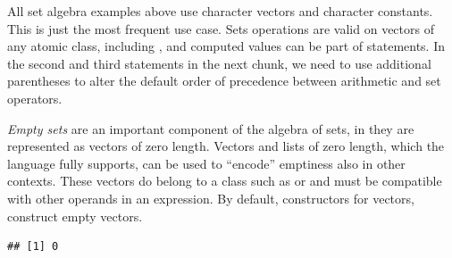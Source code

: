 \documentclass[krantz2]{krantz}\usepackage{knitr}
\begin{document}
\begin{explainbox}
All set algebra examples above use character vectors and character constants. This is just the most frequent use case. Sets operations are valid on vectors of any atomic class, including , and computed values can be part of statements. In the second and third statements in the next chunk, we need to use additional parentheses to alter the default order of precedence between arithmetic and set operators.

\begin{knitrout}\footnotesize
{}\color{fgcolor}
\end{knitrout}

\emph{Empty sets} are an important component of the algebra of sets, in \Rlang they are represented as vectors of zero length. Vectors and lists of zero length, which the \Rlang language fully supports, can be used to ``encode'' emptiness also in other contexts. These vectors do belong to a class such as  or  and must be compatible with other operands in an expression. By default, constructors for vectors, construct empty vectors.

\begin{knitrout}\footnotesize
{}\color{fgcolor}\begin{kframe}
\begin{alltt}
\hlstd{(}\hlstd{())}
\end{alltt}
\begin{verbatim}
## [1] 0
\end{verbatim}
\end{kframe}
\end{knitrout}


\end{explainbox}
\end{document}
